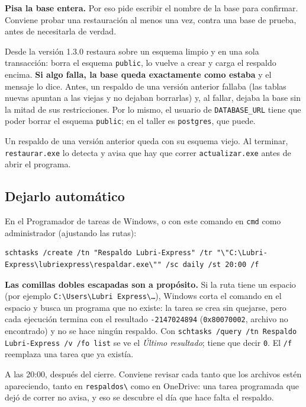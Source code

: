 \documentclass[11pt,a4paper]{article}
\begin{document}
\textbf{Pisa la base entera.} Por eso pide escribir el nombre de la base para
confirmar. Conviene probar una restauración al menos una vez, contra una base de
prueba, antes de necesitarla de verdad.

Desde la versión 1.3.0 restaura sobre un esquema limpio y en una sola
transacción: borra el esquema \texttt{public}, lo vuelve a crear y carga el
respaldo encima. \textbf{Si algo falla, la base queda exactamente como estaba}
y el mensaje lo dice. Antes, un respaldo de una versión anterior fallaba (las
tablas nuevas apuntan a las viejas y no dejaban borrarlas) y, al fallar, dejaba
la base sin la mitad de sus restricciones. Por lo mismo, el usuario de
\texttt{DATABASE\_URL} tiene que poder borrar el esquema \texttt{public}; en el
taller es \texttt{postgres}, que puede.

Un respaldo de una versión anterior queda con su esquema viejo. Al terminar,
\texttt{restaurar.exe} lo detecta y avisa que hay que correr
\texttt{actualizar.exe} antes de abrir el programa.

\subsection{Dejarlo automático}

En el Programador de tareas de Windows, o con este comando en \texttt{cmd} como
administrador (ajustando las rutas):

\begin{lstlisting}
schtasks /create /tn "Respaldo Lubri-Express" /tr "\"C:\Lubri-Express\lubriexpress\respaldar.exe\"" /sc daily /st 20:00 /f
\end{lstlisting}

\textbf{Las comillas dobles escapadas son a propósito.} Si la ruta tiene un espacio
(por ejemplo \texttt{C:\textbackslash Users\textbackslash Lubri Express\textbackslash\ldots}),
Windows corta el comando en el espacio y busca un programa que no existe: la tarea
se crea sin quejarse, pero cada ejecución termina con el resultado
\texttt{-2147024894} (\texttt{0x80070002}, archivo no encontrado) y no se hace ningún
respaldo. Con \texttt{schtasks /query /tn \textquotedbl Respaldo Lubri-Express\textquotedbl{} /v /fo list} se ve el
\emph{Último resultado}; tiene que decir \texttt{0}. El \texttt{/f} reemplaza una tarea
que ya existía.

A las 20:00, después del cierre. Conviene revisar cada tanto que los archivos
estén apareciendo, tanto en \texttt{respaldos\textbackslash} como en OneDrive:
una tarea programada que dejó de correr no avisa, y eso se descubre el día que
hace falta el respaldo.
\end{document}
